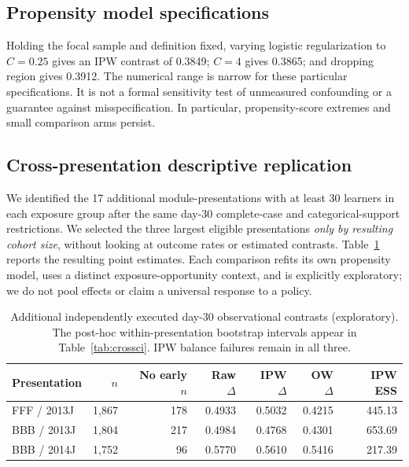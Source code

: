 \documentclass[10pt,a4paper]{article}
\begin{document}
\subsection{Propensity model specifications}
Holding the focal sample and definition fixed, varying logistic regularization to $C=0.25$ gives an IPW contrast of 0.3849; $C=4$ gives 0.3865; and dropping region gives 0.3912. The numerical range is narrow for these particular specifications. It is not a formal sensitivity test of unmeasured confounding or a guarantee against misspecification. In particular, propensity-score extremes and small comparison arms persist.

\subsection{Cross-presentation descriptive replication}
We identified the 17 additional module-presentations with at least 30 learners in each exposure group after the same day-30 complete-case and categorical-support restrictions. We selected the three largest eligible presentations \emph{only by resulting cohort size}, without looking at outcome rates or estimated contrasts. Table~\ref{tab:otherpresentations} reports the resulting point estimates. Each comparison refits its own propensity model, uses a distinct exposure-opportunity context, and is explicitly exploratory; we do not pool effects or claim a universal response to a policy.
\begin{table}[ht]\centering\small
\caption{Additional independently executed day-30 observational contrasts (exploratory). The post-hoc within-presentation bootstrap intervals appear in Table~\ref{tab:crossci}. IPW balance failures remain in all three.}
\label{tab:otherpresentations}
\begin{tabular}{lrrrrrr}\toprule
Presentation & $n$ & No early $n$ & Raw $\Delta$ & IPW $\Delta$ & OW $\Delta$ & IPW ESS\\\midrule
FFF / 2013J & 1,867 & 178 & 0.4933 & 0.5032 & 0.4215 & 445.13\\
BBB / 2013J & 1,804 & 217 & 0.4984 & 0.4768 & 0.4301 & 653.69\\
BBB / 2014J & 1,752 & 96 & 0.5770 & 0.5610 & 0.5416 & 217.39\\\bottomrule
\end{tabular}
\end{table}
\end{document}
